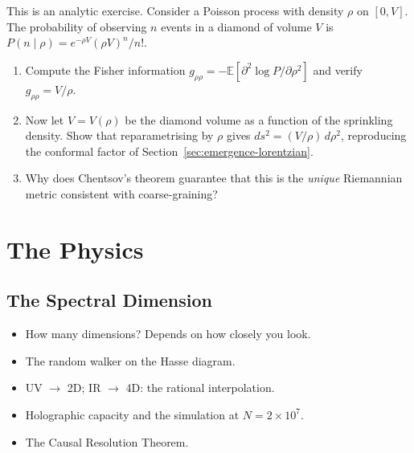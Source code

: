 \documentclass[11pt, a4paper, openany]{book}
\newenvironment{introduction}[1][Modulo Overview]{%
  \begin{tcolorbox}[
    enhanced,colback=structure!5,colframe=structure,
    colbacktitle=structure,coltitle=white,
    fonttitle=\small\bfseries,title={#1},
    arc=2pt,boxrule=0.7pt,
    left=8pt,right=8pt,top=6pt,bottom=6pt,
    before skip=12pt,after skip=12pt
  ]\itshape\begin{itemize}[leftmargin=*,itemsep=2pt,parsep=0pt]
}{%
  \end{itemize}\end{tcolorbox}
}
\begin{document}
\begin{simulation}
This is an analytic exercise. Consider a Poisson process with density $\rho$ on $[0, V]$. The probability of observing $n$ events in a diamond of volume $V$ is $P(n \mid \rho) = e^{-\rho V}(\rho V)^n / n!$.
\begin{enumerate}
\item Compute the Fisher information $g_{\rho\rho} = -\mathbb{E}[\partial^2 \log P / \partial \rho^2]$ and verify $g_{\rho\rho} = V/\rho$.
\item Now let $V = V(\rho)$ be the diamond volume as a function of the sprinkling density. Show that reparametrising by $\rho$ gives $ds^2 = (V/\rho)\,d\rho^2$, reproducing the conformal factor of Section~\ref{sec:emergence-lorentzian}.
\item Why does Chentsov's theorem guarantee that this is the \emph{unique} Riemannian metric consistent with coarse-graining?
\end{enumerate}
\end{simulation}


\part{The Physics}

\chapter{The Spectral Dimension}\label{ch:spectral}

\begin{introduction}
  \item How many dimensions? Depends on how closely you look.
  \item The random walker on the Hasse diagram.
  \item UV $\to$ 2D; IR $\to$ 4D: the rational interpolation.
  \item Holographic capacity and the simulation at $N = 2 \times 10^7$.
  \item The Causal Resolution Theorem.
\end{introduction}
\end{document}
